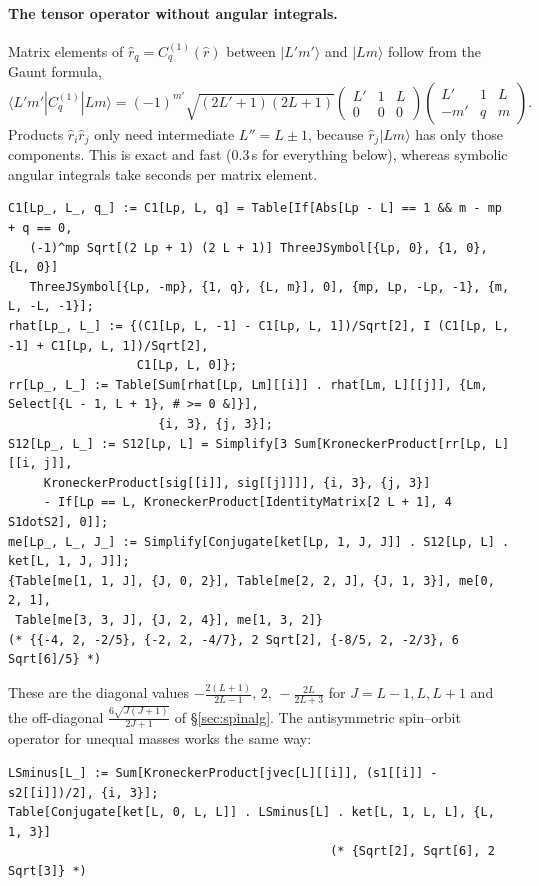 \documentclass[11pt,a4paper]{article}
\numberwithin{equation}{section}
\theoremstyle{definition}
\theoremstyle{plain}
\theoremstyle{remark}
\numberwithin{algorithm}{section}
\begin{document}
\paragraph{The tensor operator without angular integrals.} Matrix elements of $\hat r_q=C^{(1)}_q(\hat r)$ between $|L'm'\rangle$ and $|Lm\rangle$ follow from the Gaunt formula,
\[
\langle L'm'|C^{(1)}_q|Lm\rangle=(-1)^{m'}\sqrt{(2L'+1)(2L+1)}\begin{pmatrix}L'&1&L\\0&0&0\end{pmatrix}\begin{pmatrix}L'&1&L\\-m'&q&m\end{pmatrix}.
\]
 Products $\hat r_i\hat r_j$ only need intermediate $L''=L\pm1$, because $\hat r_j|Lm\rangle$ has only those components. This is exact and fast ($0.3\,$s for everything below), whereas symbolic angular integrals take seconds per matrix element.
\begin{lstlisting}[style=wl]
C1[Lp_, L_, q_] := C1[Lp, L, q] = Table[If[Abs[Lp - L] == 1 && m - mp + q == 0,
   (-1)^mp Sqrt[(2 Lp + 1) (2 L + 1)] ThreeJSymbol[{Lp, 0}, {1, 0}, {L, 0}]
   ThreeJSymbol[{Lp, -mp}, {1, q}, {L, m}], 0], {mp, Lp, -Lp, -1}, {m, L, -L, -1}];
rhat[Lp_, L_] := {(C1[Lp, L, -1] - C1[Lp, L, 1])/Sqrt[2], I (C1[Lp, L, -1] + C1[Lp, L, 1])/Sqrt[2],
                  C1[Lp, L, 0]};
rr[Lp_, L_] := Table[Sum[rhat[Lp, Lm][[i]] . rhat[Lm, L][[j]], {Lm, Select[{L - 1, L + 1}, # >= 0 &]}],
                     {i, 3}, {j, 3}];
S12[Lp_, L_] := S12[Lp, L] = Simplify[3 Sum[KroneckerProduct[rr[Lp, L][[i, j]],
     KroneckerProduct[sig[[i]], sig[[j]]]], {i, 3}, {j, 3}]
     - If[Lp == L, KroneckerProduct[IdentityMatrix[2 L + 1], 4 S1dotS2], 0]];
me[Lp_, L_, J_] := Simplify[Conjugate[ket[Lp, 1, J, J]] . S12[Lp, L] . ket[L, 1, J, J]];
{Table[me[1, 1, J], {J, 0, 2}], Table[me[2, 2, J], {J, 1, 3}], me[0, 2, 1],
 Table[me[3, 3, J], {J, 2, 4}], me[1, 3, 2]}
(* {{-4, 2, -2/5}, {-2, 2, -4/7}, 2 Sqrt[2], {-8/5, 2, -2/3}, 6 Sqrt[6]/5} *)
\end{lstlisting}
These are the diagonal values $-\frac{2(L+1)}{2L-1},\,2,\,-\frac{2L}{2L+3}$ for $J=L-1,L,L+1$ and the off-diagonal $\frac{6\sqrt{J(J+1)}}{2J+1}$ of \S\ref{sec:spinalg}. The antisymmetric spin--orbit operator for unequal masses works the same way:
\begin{lstlisting}[style=wl]
LSminus[L_] := Sum[KroneckerProduct[jvec[L][[i]], (s1[[i]] - s2[[i]])/2], {i, 3}];
Table[Conjugate[ket[L, 0, L, L]] . LSminus[L] . ket[L, 1, L, L], {L, 1, 3}]
                                             (* {Sqrt[2], Sqrt[6], 2 Sqrt[3]} *)
\end{lstlisting}
\end{document}
